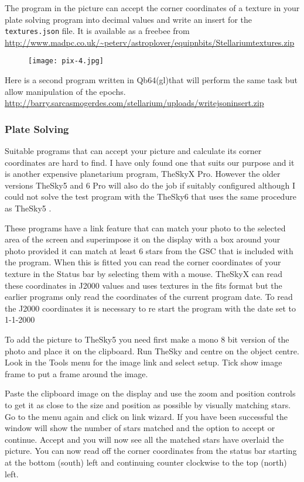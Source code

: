 The program in the picture can accept the corner coordinates of a
texture in your plate solving program into decimal values and write an
insert for the \texttt{textures.json} file. It is available as a freebee
from
\url{http://www.madpc.co.uk/~peterv/astroplover/equipnbits/Stellariumtextures.zip}

\begin{figure}[h]
\centering\texttt{[image: pix-4.jpg]}
\end{figure}

Here is a second program written in Qb64(gl)that will perform the same
task but allow manipulation of the epochs.
\url{http://barry.sarcasmogerdes.com/stellarium/uploads/writejsoninsert.zip}

\subsubsection{Plate Solving}\label{plate-solving}

Suitable programs that can accept your picture and calculate its corner
coordinates are hard to find. I have only found one that suits our
purpose and it is another expensive planetarium program, TheSkyX Pro.
However the older versions TheSky5 and 6 Pro will also do the job if
suitably configured although I could not solve the test program with the
TheSky6 that uses the same procedure as TheSky5 .

These programs have a link feature that can match your photo to the
selected area of the screen and superimpose it on the display with a box
around your photo provided it can match at least 6 stars from the GSC
that is included with the program. When this is fitted you can read the
corner coordinates of your texture in the Status bar by selecting them
with a mouse. TheSkyX can read these coordinates in J2000 values and
uses textures in the fits format but the earlier programs only read the
coordinates of the current program date. To read the J2000 coordinates
it is necessary to re start the program with the date set to 1-1-2000

To add the picture to TheSky5 you need first make a mono 8 bit version
of the photo and place it on the clipboard. Run TheSky and centre on the
object centre. Look in the Tools menu for the image link and select
setup. Tick show image frame to put a frame around the image.

Paste the clipboard image on the display and use the zoom and position
controls to get it as close to the size and position as possible by
visually matching stars. Go to the menu again and click on link wizard.
If you have been successful the window will show the number of stars
matched and the option to accept or continue. Accept and you will now
see all the matched stars have overlaid the picture. You can now read
off the corner coordinates from the status bar starting at the bottom
(south) left and continuing counter clockwise to the top (north) left.

